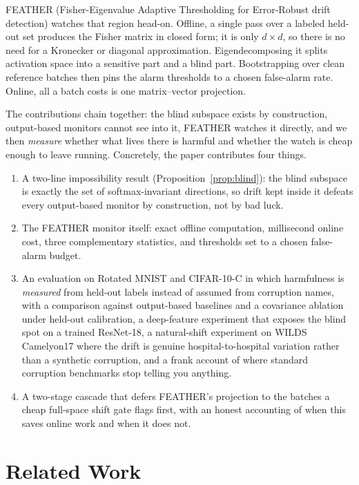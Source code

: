 \documentclass[graybox]{SNmult}
\begin{document}
FEATHER (Fisher-Eigenvalue Adaptive Thresholding for Error-Robust drift
detection) watches that region head-on. Offline, a single pass over a labeled
held-out set produces the Fisher matrix in closed form; it is only
$d \times d$, so there is no need for a Kronecker or diagonal approximation.
Eigendecomposing it splits activation space into a sensitive part and a blind
part. Bootstrapping over clean reference batches then pins the alarm
thresholds to a chosen false-alarm rate. Online, all a batch costs is one
matrix--vector projection.

The contributions chain together: the blind subspace exists by construction,
output-based monitors cannot see into it, FEATHER watches it directly, and we
then \emph{measure} whether what lives there is harmful and whether the watch is
cheap enough to leave running. Concretely, the paper contributes four things.
\begin{enumerate}
  \item{A two-line impossibility result
    (Proposition~\ref{prop:blind}): the blind subspace is exactly the set of
    softmax-invariant directions, so drift kept inside it defeats every
    output-based monitor by construction, not by bad luck.}
  \item{The FEATHER monitor itself: exact offline computation, millisecond
    online cost, three complementary statistics, and thresholds set to a
    chosen false-alarm budget.}
  \item{An evaluation on Rotated MNIST and CIFAR-10-C in which harmfulness is
    \emph{measured} from held-out labels instead of assumed from corruption
    names, with a comparison against output-based baselines and a covariance
    ablation under held-out calibration, a deep-feature experiment that
    exposes the blind spot on a trained ResNet-18, a natural-shift experiment
    on WILDS Camelyon17 where the drift is genuine hospital-to-hospital
    variation rather than a synthetic corruption, and a frank account of where
    standard corruption benchmarks stop telling you anything.}
  \item{A two-stage cascade that defers FEATHER's projection to the batches a
    cheap full-space shift gate flags first, with an honest accounting of when
    this saves online work and when it does not.}
\end{enumerate}

\section{Related Work}
\label{sec:related}
\end{document}
